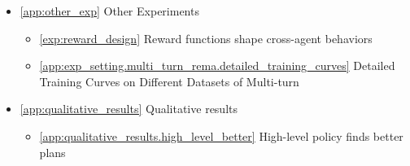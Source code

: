 \begin{itemize}
\begin{itemize}
        \begin{itemize}
            \item \ref{app:exp_setting.single_turn_rema.sft_data} Supervised fine-tuning data collection \dotfill \pageref{app:exp_setting.single_turn_rema.sft_data}
            \item \ref{app:exp_setting.single_turn_rema.rewardbench970} Dataset Curation of RewardBench970 \dotfill \pageref{app:exp_setting.single_turn_rema.rewardbench970}
            \item \ref{app:exp_setting.single_turn_rema.math} Training on MATH \dotfill \pageref{app:exp_setting.single_turn_rema.math}
            \item \ref{app:exp_setting.single_turn_rema.reward_bench} Training on Reward Bench \dotfill \pageref{app:exp_setting.single_turn_rema.reward_bench}
        \end{itemize}
        \item \ref{app:exp_setting.multi_turn_rema} Multi-turn ReMA \dotfill \pageref{app:exp_setting.multi_turn_rema}
        \begin{itemize}
            \item \ref{app:exp_setting.multi_turn_rema.sft_data} SFT data collection of multi-turn MAMRP \dotfill \pageref{app:exp_setting.multi_turn_rema.sft_data}
            \item \ref{app:exp_setting.multi_turn_rema.math} Training on MATH \dotfill \pageref{app:exp_setting.multi_turn_rema.math}
        \end{itemize}
    \end{itemize}
    \item \ref{app:other_exp} Other Experiments \dotfill \pageref{app:other_exp}
    \begin{itemize}
        \item \ref{exp:reward_design} Reward functions shape cross-agent behaviors \dotfill \pageref{exp:reward_design}
        \item \ref{app:exp_setting.multi_turn_rema.detailed_training_curves} Detailed Training Curves on Different Datasets of Multi-turn \method \dotfill\pageref{app:exp_setting.multi_turn_rema.detailed_training_curves}
    \end{itemize}
    \item \ref{app:qualitative_results} Qualitative results \dotfill \pageref{app:qualitative_results}
    \begin{itemize}
        \item \ref{app:qualitative_results.high_level_better} High-level policy finds better plans \dotfill \pageref{app:qualitative_results.high_level_better}

\end{itemize}
\end{itemize}
